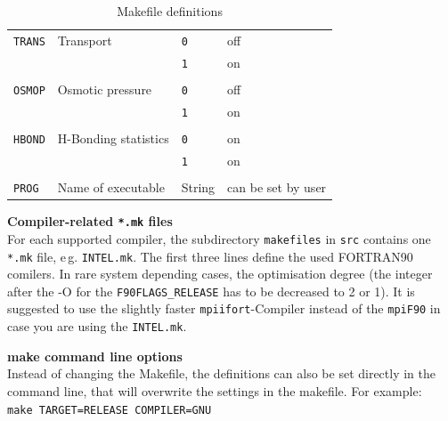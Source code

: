 \begin{table}[h!]
\begin{tabular}{llll}
		\texttt{TRANS}    &        Transport          & \texttt{0} & off \\
		&                           & \texttt{1} & on \\
		&                           &  &  \\
		
		\texttt{OSMOP}    &         Osmotic pressure  & \texttt{0} & off \\
		&                           & \texttt{1} & on \\
		&                           &  &  \\
		
		\texttt{HBOND}    &     H-Bonding statistics  & \texttt{0} & on \\
		&                           & \texttt{1} & on \\
		&                           &  &  \\
		
		\texttt{PROG}    &     Name of executable  & String & can be set by user \\
		\bottomrule
	\end{tabular}
	\caption{Makefile definitions}
	\label{tab:makefiledef}
\end{table}
\renewcommand{\arraystretch}{1}

\pagebreak


\textbf{Compiler-related \texttt{*.mk} files}\\
For each supported compiler, the subdirectory \texttt{makefiles} in \texttt{src} contains one \texttt{*.mk} file, e\,g. \texttt{INTEL.mk}. The first three lines define the used FORTRAN90 comilers. In rare system depending cases, the optimisation degree (the integer after the -O for the \texttt{F90FLAGS\_RELEASE} has to be decreased to 2 or 1). It is suggested to use the slightly faster \texttt{mpiifort}-Compiler instead of the \texttt{mpiF90} in case you are using the \texttt{INTEL.mk}.

\textbf{make command line options}\\
Instead of changing the Makefile, the definitions can also be set directly in the command line, that will overwrite the settings in the makefile. For example:\\

\texttt{make TARGET=RELEASE COMPILER=GNU}




